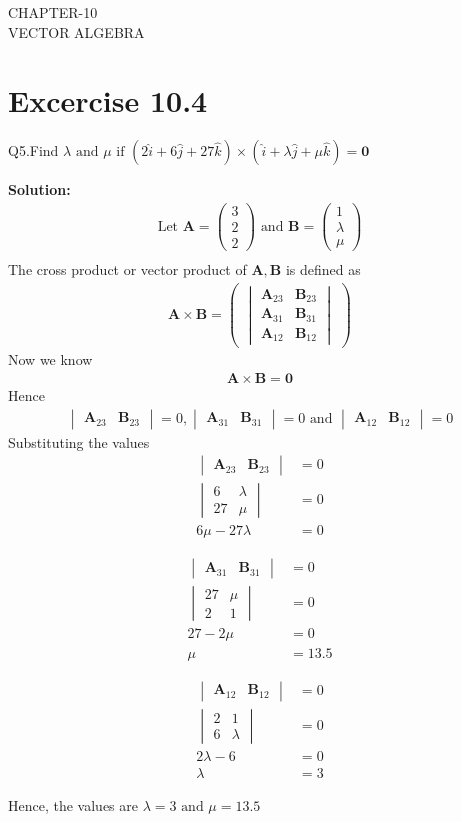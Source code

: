 \documentclass[12pt]{article}
\newcommand{\mydet}[1]{\ensuremath{\begin{vmatrix}#1\end{vmatrix}}}
\newcommand{\solution}{\noindent \textbf{Solution: }}
\newcommand{\myvec}[1]{\ensuremath{\begin{pmatrix}#1\end{pmatrix}}}
\let\vec\mathbf
\begin{document}
\begin{center}
\textbf\large{CHAPTER-10 \\ VECTOR ALGEBRA}

\end{center}
\section*{Excercise 10.4}

Q5.Find $\lambda \text{ and } \mu \text{ if } (2\hat{i}+6\hat{j}+27\hat{k}) \times (\hat{i}+\lambda \hat{j}+\mu \hat{k})=\vec{0}$

\solution
\begin{align}
	\text{Let } \vec{A} = \myvec{3\\2\\2} \text{ and } \vec{B} = \myvec{1\\ \lambda \\ \mu}\\
\end{align}
The cross product or vector product of $\vec{A},\vec{B}$ is defined as
\begin{align}
	\vec{A} \times \vec{B} = \myvec{\mydet{\vec{A}_{23}&\vec{B}_{23}\\\vec{A}_{31}&\vec{B}_{31}\\\vec{A}_{12}&\vec{B}_{12}}}
\end{align}
Now we know
\begin{align}
	\vec{A} \times \vec{B} = \vec{0}
\end{align}
Hence
\begin{align}
	\mydet{\vec{A}_{23}&\vec{B}_{23}}=0,
	\mydet{\vec{A}_{31}&\vec{B}_{31}}=0 \text{ and }
	\mydet{\vec{A}_{12}&\vec{B}_{12}}=0
\end{align}
Substituting the values
\begin{align}
	\mydet{\vec{A}_{23}&\vec{B}_{23}}&=0\\
	\mydet{6&\lambda\\27&\mu}&=0\\
	6\mu-27\lambda&=0
\end{align}

\begin{align}
	\mydet{\vec{A}_{31}&\vec{B}_{31}}&=0\\
	\mydet{27&\mu\\2&1}&=0\\
	27-2\mu&=0\\
	\mu&=13.5
\end{align}

\begin{align}
	\mydet{\vec{A}_{12}&\vec{B}_{12}}&=0\\
	\mydet{2&1\\6&\lambda}&=0\\
	2\lambda-6&=0\\
	\lambda&=3
\end{align}

Hence, the values are $\lambda = 3 \text{ and } \mu = 13.5$
\end{document}
